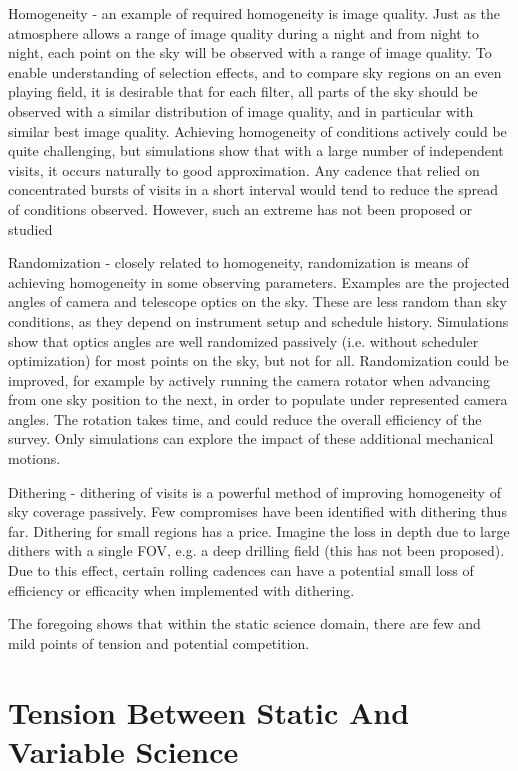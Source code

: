 Homogeneity - an  example of required homogeneity is image quality.
Just as the atmosphere allows a range of image quality during a night
and from night to night, each point on the sky will be observed with a
range of image quality.  To enable understanding of selection effects,
and to compare sky regions on an even playing field, it is desirable
that for each filter, all parts of the sky should be observed with a
similar distribution of image quality, and in particular with similar
best image quality. Achieving homogeneity of conditions actively could
be quite challenging, but simulations show that with a large number of
independent visits, it occurs naturally to good approximation.  Any
cadence that relied on concentrated bursts of visits in a short interval
would tend to reduce the spread of conditions observed. However, such an
extreme has not been proposed or studied

Randomization - closely related to homogeneity, randomization is means
of achieving homogeneity in some observing parameters.  Examples are the
projected angles of camera and telescope optics on the sky. These are
less random than sky conditions, as they depend on instrument setup and
schedule history.  Simulations show that optics angles are well
randomized passively (i.e. without scheduler optimization) for most
points on the sky, but not for all.  Randomization could be improved,
for example by actively running the camera rotator when advancing from
one sky position to the next, in order to populate under represented
camera angles. The rotation takes time, and could reduce the overall
efficiency of the survey.  Only simulations can explore the impact of
these additional mechanical motions.

Dithering - dithering of visits is a powerful method of improving
homogeneity of sky coverage passively. Few compromises have been
identified with dithering thus far.  Dithering for small regions has a
price. Imagine the loss in depth due to large dithers with a single FOV,
e.g. a deep drilling field (this has not been proposed).  Due to this
effect, certain rolling cadences can have a potential small loss of
efficiency or efficacity when implemented with dithering.

The foregoing shows that within the static science domain, there are few
and mild points of tension and potential competition.


\section{Tension Between Static And Variable Science}

